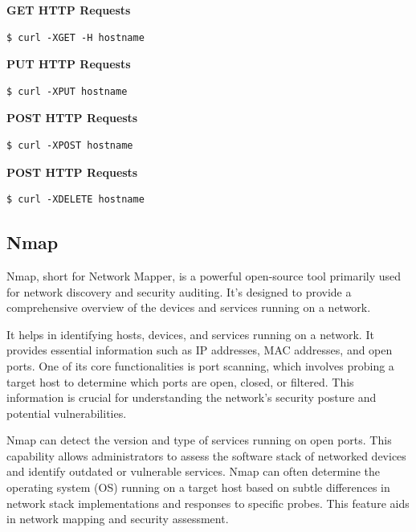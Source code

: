 \documentclass{article}
\newenvironment{codetemplate}[1][]{%
  \mybasecolorbox[#1]
  \itshape
}{%
  \endmybasecolorbox
}
\begin{document}
\textbf{GET HTTP Requests}
\begin{codetemplate}{}
\begin{verbatim}
$ curl -XGET -H hostname 
\end{verbatim}
\end{codetemplate}

\textbf{PUT HTTP Requests}
\begin{codetemplate}{}
\begin{verbatim}
$ curl -XPUT hostname 
\end{verbatim}
\end{codetemplate}

\textbf{POST HTTP Requests}
\begin{codetemplate}{}
\begin{verbatim}
$ curl -XPOST hostname 
\end{verbatim}
\end{codetemplate}

\textbf{POST HTTP Requests}
\begin{codetemplate}{}
\begin{verbatim}
$ curl -XDELETE hostname 
\end{verbatim}
\end{codetemplate}

\subsection{Nmap}

Nmap, short for Network Mapper, is a powerful open-source tool primarily used for network discovery and security auditing. It's designed to provide a comprehensive overview of the devices and services running on a network.

It helps in identifying hosts, devices, and services running on a network. It provides essential information such as IP addresses, MAC addresses, and open ports. One of its core functionalities is port scanning, which involves probing a target host to determine which ports are open, closed, or filtered. This information is crucial for understanding the network's security posture and potential vulnerabilities.

Nmap can detect the version and type of services running on open ports. This capability allows administrators to assess the software stack of networked devices and identify outdated or vulnerable services. Nmap can often determine the operating system (OS) running on a target host based on subtle differences in network stack implementations and responses to specific probes. This feature aids in network mapping and security assessment.
\end{document}
